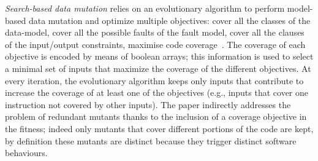 \emph{Search-based data mutation} relies on an evolutionary algorithm to perform model-based data mutation and optimize multiple objectives:  
cover all the classes of the data-model, cover all the possible faults of the fault model, cover all the clauses of the input/output constraints,
maximise code coverage~\cite{di2015evolutionary}.
The coverage of each objective is encoded by means of boolean arrays; this information is used to select a minimal set of inputs that maximize the coverage of the different objectives.
At every iteration, the evolutionary algorithm keeps only inputs that contribute to increase the coverage of at least one of the objectives (e.g., inputs that cover one instruction not covered by other inputs).
The paper indirectly addresses the problem of redundant mutants thanks to the inclusion of a coverage objective in the fitness; indeed only mutants that cover different portions of the code are kept, by definition these mutants are distinct because they trigger distinct software behaviours.

